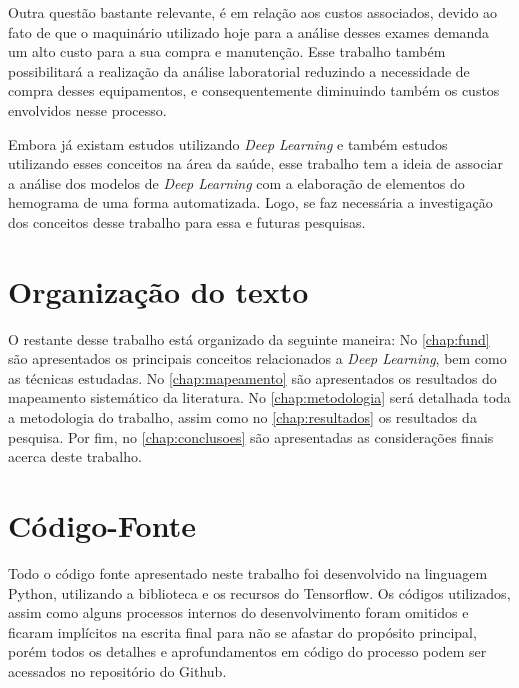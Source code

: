 Outra questão bastante relevante, é em relação aos custos associados, devido ao fato de que o maquinário utilizado hoje para a análise desses exames demanda um alto custo para a sua compra e manutenção. Esse trabalho também possibilitará a realização da análise laboratorial reduzindo a necessidade de compra desses equipamentos, e consequentemente diminuindo também os custos envolvidos nesse processo.

Embora já existam estudos utilizando \emph{Deep Learning} e também estudos utilizando esses conceitos na área da saúde, esse trabalho tem a ideia de associar a análise dos modelos de \emph{Deep Learning} com a elaboração de elementos do hemograma de uma forma automatizada. Logo, se faz necessária a investigação dos conceitos desse trabalho para essa e futuras pesquisas.

\section{Organização do texto}
\label{sec:organizacao}
O restante desse trabalho está organizado da seguinte maneira: No \autoref{chap:fund} são apresentados os principais conceitos relacionados a \emph{Deep Learning}, bem como as técnicas estudadas. No \autoref{chap:mapeamento} são apresentados os resultados do mapeamento sistemático da literatura. No \autoref{chap:metodologia} será detalhada toda a metodologia do trabalho, assim como no \autoref{chap:resultados} os resultados da pesquisa. Por fim, no \autoref{chap:conclusoes} são apresentadas as considerações finais acerca deste trabalho.

\section{Código-Fonte}
Todo o código fonte apresentado neste trabalho foi desenvolvido na linguagem Python, utilizando a biblioteca e os recursos do Tensorflow. Os códigos utilizados, assim como alguns processos internos do desenvolvimento foram omitidos e ficaram implícitos na escrita final para não se afastar do propósito principal, porém todos os detalhes e aprofundamentos em código do processo podem ser acessados no repositório do Github. \cite{anthonyGithub}

